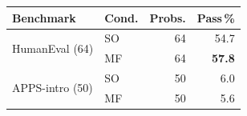 \footnotesize
\begin{tabular}{@{}llrr@{}}
\toprule
Benchmark & Cond. & Probs. & Pass\,\% \\
\midrule
\multirow{2}{*}{HumanEval (64)}
  & SO & 64 & 54.7 \\
  & MF & 64 & \textbf{57.8} \\
\midrule
\multirow{2}{*}{APPS-intro (50)}
  & SO & 50 &  6.0 \\
  & MF & 50 &  5.6 \\
\bottomrule
\end{tabular}
